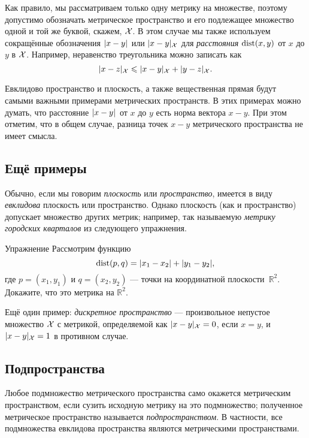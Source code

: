 Как правило, мы рассматриваем только одну метрику на множестве, поэтому допустимо обозначать метрическое пространство и его подлежащее множество одной и той же буквой, скажем, $\mathcal{X}$.
В этом случае мы также используем сокращённые обозначения $\dist{x}{y}{}$ или $\dist{x}{y}{\spc{X}}$ для \emph{расстояния} $\mathop{\rm dist}\nolimits(x,y)$ от $x$ до $y$ в $\mathcal{X}$.
Например, неравенство треугольника можно записать как
$$\dist{x}{z}{\spc{X}}\le \dist{x}{y}{\spc{X}}+\dist{y}{z}{\spc{X}}.$$

Евклидово пространство и плоскость, а также вещественная прямая будут самыми важными примерами метрических пространств.
В этих примерах можно думать, что расстояние $\dist{x}{y}{}$ от $x$ до $y$ есть норма вектора $x-y$.
При этом отметим, что в общем случае, разница точек $x-y$ метрического пространства не имеет смысла.

\subsection*{Ещё примеры}

Обычно, если мы говорим \emph{плоскость} или \emph{пространство}, имеется в виду \emph{евклидова} плоскость или пространство.
Однако плоскость (как и пространство) допускает множество других метрик; например, так называемую \emph{метрику городских кварталов} из следующего упражнения.

\begin{thm}{Упражнение}\label{ex:ell-infty}
Рассмотрим функцию
$$\mathop{\rm dist}\nolimits(p,q)=|x_1-x_2|+|y_1-y_2|,$$
где $p=(x_1,y_1)$ и $q=(x_2,y_2)$ --- точки на координатной плоскости~$\mathbb{R}^2$.
Докажите, что это метрика на $\mathbb{R}^2$.
\end{thm}

Ещё один пример: \emph{дискретное пространство} --- произвольное непустое множество $\mathcal{X}$ с метрикой, определяемой как $\dist{x}{y}{\spc{X}}=0$, если $x=y$, и $\dist{x}{y}{\spc{X}}=1$ в противном случае.

\subsection*{Подпространства}

{\sloppy

Любое подмножество метрического пространства само окажется метрическим пространством, если сузить исходную метрику на это подмножество;
полученное метрическое пространство называется \emph{подпространством}.
В частности, все подмножества евклидова пространства являются метрическими пространствами.

}

